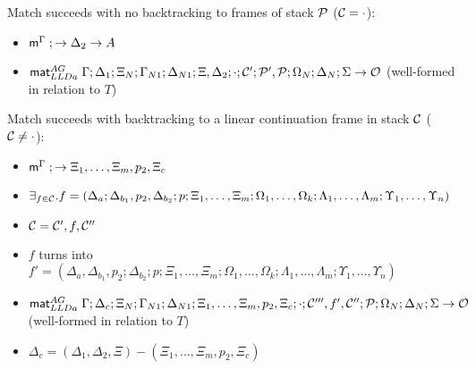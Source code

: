 \item Match succeeds with no backtracking to frames of stack $\mathcal{P}$
($\mathcal{C} = \cdot$):
\begin{itemize}[leftmargin=\secondm]
   \item $\mathsf{m}^{\Gamma} \; ; \rightarrow \Delta_2 \rightarrow A$
   \item $\mathsf{mat}_{LLDa}^{AG} \; \Gamma; \Delta_1; \Xi_N; \Gamma_{N1}; \Delta_{N1}; \Xi,
      \Delta_2; \cdot; \mathcal{C'}; \mathcal{P'}, \mathcal{P}; \Omega_N; \Delta_N;
      \Sigma \rightarrow \mathcal{O}$ (well-formed in relation to $T$)
\end{itemize}

\item Match succeeds with backtracking to a linear continuation frame in
stack $\mathcal{C}$ ($\mathcal{C} \neq \cdot$):

\begin{itemize}[leftmargin=\secondm]
   \item $\mathsf{m}^{\Gamma} \; ; \rightarrow \Xi_1, \dotsc, \Xi_m, p_2, \Xi_c$
   \item $\exists_{f \in \mathcal{C}}. f = (\Delta_a; \Delta_{b_1}, p_2,
         \Delta_{b_2}; p; \Xi_1, \dotsc, \Xi_m; \Omega_1, \dotsc,
         \Omega_k; \Lambda_1, \dotsc, \Lambda_m; \Upsilon_1, \dotsc,
         \Upsilon_n)$
   \item $\mathcal{C} = \mathcal{C'}, f, \mathcal{C''}$
   \item $f$ turns into $f' = (\Delta_a, \Delta_{b_1}, p_2;
         \Delta_{b_2}; p; \Xi_1, \dotsc, \Xi_m;
         \Omega_1, \dotsc, \Omega_k; \Lambda_1, \dotsc, \Lambda_m;
         \Upsilon_1, \dotsc, \Upsilon_n)$
   \item $\mathsf{mat}_{LLDa}^{AG} \; \Gamma; \Delta_c; \Xi_N; \Gamma_{N1}; \Delta_{N1}; \Xi_1,
      \dotsc, \Xi_m, p_2, \Xi_c; \cdot; \mathcal{C'''}, f', \mathcal{C''}; \mathcal{P};
      \Omega_N; \Delta_N; \Sigma \rightarrow \mathcal{O}$ (well-formed in relation to $T$)
   \item $\Delta_c = (\Delta_1, \Delta_2, \Xi) - (\Xi_1, \dotsc, \Xi_m,
         p_2, \Xi_c)$
\end{itemize}


